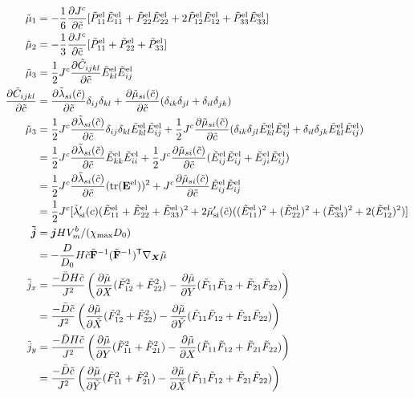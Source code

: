 \begin{align}
    \td{\mu}_1 &= -\fc{1}{6}\pdiff{\jc}{\tc} [\tPel{11}\tEel{11} + \tPel{22}\tEel{22} + 2\tPel{12}\tEel{12} + \tPel{33}\tEel{33}] \\
    \td{\mu}_2 &= -\fc{1}{3}\pdiff{ \jc}{\tc}[\tPel{11} + \tPel{22} + \tPel{33}] \\
    \td{\mu}_3 &= \fc{1}{2}\jc \pdiff{ \td{C}_{ijkl}}{\tc}\tEel{kl}\tEel{ij} \\
    \pdiff{\td{C}_{ijkl}}{\tc} &= \pdiff{\td{\lambda}_{si}(\tc)}{\tc}\delta_{ij} \delta_{kl} +  \pdiff{\td{\mu}_{si}(\tc)}{\tc}(\delta_{ik} \delta_{jl} + \delta_{il} \delta_{jk})  \\
    \td{\mu}_3  &=  \fc{1}{2}\jc \pdiff{\td{\lambda}_{si}(\tc)}{\tc}\delta_{ij} \delta_{kl} \tEel{kl}\tEel{ij} + \fc{1}{2}\jc\pdiff{\td{\mu}_{si}(\tc)}{\tc}(\delta_{ik} \delta_{jl} \tEel{kl}\tEel{ij} + \delta_{il} \delta_{jk} \tEel{kl}\tEel{ij})  \nonumber \\
    &=  \fc{1}{2}\jc \pdiff{\td{\lambda}_{si}(\tc)}{\tc} \tEel{kk}\tEel{ii} + \fc{1}{2}\jc\pdiff{\td{\mu}_{si}(\tc)}{\tc}(\tEel{ij}\tEel{ij} +  \tEel{ji}\tEel{ij}) \nonumber  \\
    &=  \fc{1}{2}\jc \pdiff{\td{\lambda}_{si}(\tc)}{\tc} (\mathrm{tr}(\mathbf{E^{\rm{el}}}))^2 + \jc\pdiff{\td{\mu}_{si}(\tc)}{\tc}\tEel{ij}\tEel{ij} \nonumber \\
    &= \fc{1}{2}\jc[\tlamsi'(c)(\tEel{11} + \tEel{22} + \tEel{33})^2 + 2\tmusi'(\td{c})((\tEel{11})^2 + (\tEel{22})^2 + (\tEel{33})^2 + 2 (\tEel{12})^2)]\\
    \bm{\td j} &= \bm{j}H V_m^b/(\chi_{\text{max}}D_0) \nonumber \\
                &= -\fc{D}{D_0}H \tc \td{\F}^{-1}(\td{\F}^{-1})^\T \nabla_{\X} \td \mu\\
    \td{j}_x &= \fc{-\bar{D} H \tc}{J^2} \left(\pdiff{ \td \mu}{X}(\tF{12}^2 + \tF{22}^2) - \pdiff{ \td \mu}{ Y}(\tF{11}\tF{12} + \tF{21}\tF{22})\right) \nonumber \\
    &= \fc{-\bar{D}  \tc}{J^2} \left(\pdiff{ \td \mu}{\tX}(\tF{12}^2 + \tF{22}^2) - \pdiff{ \td \mu}{\tY}(\tF{11}\tF{12} + \tF{21}\tF{22})\right)\\
    \td{j}_y &= \fc{-\bar{D} H \tc}{J^2} \left(\pdiff{ \td \mu}{Y}(\tF{11}^2 + \tF{21}^2) - \pdiff{ \td \mu}{X}(\tF{11}\tF{12} + \tF{21}\tF{22})\right) \nonumber \\
    &= \fc{-\bar{D}  \tc}{J^2} \left( \pdiff{ \td \mu}{\tY}(\tF{11}^2 + \tF{21}^2) -\pdiff{ \td \mu}{\tX}(\tF{11}\tF{12} + \tF{21}\tF{22})\right)
\end{align}


